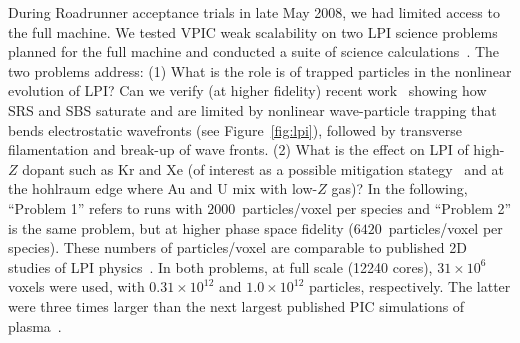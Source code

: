 \documentclass[journal,twoside]{IEEEtran}
\newcommand{\fig}[1]{Figure~\ref{fig:#1}}
\begin{document}
During Roadrunner acceptance trials in late May 2008, we had limited
access to the full machine.  We tested VPIC weak scalability on two
LPI science problems planned for the full machine and conducted a
suite of science calculations~\cite{AAC_Conference_Paper}.  The two
problems
address:
(1) What is the role is of trapped particles in the nonlinear
evolution of LPI?  Can we verify (at higher fidelity) recent
work~\cite{Yin_et_al_PRL_2007_SRS,Yin_et_al_Phys_Plasmas_2007_SRS}
showing how SRS and SBS saturate and are limited by nonlinear
wave-particle trapping that bends electrostatic wavefronts (see
\fig{lpi}), followed by transverse filamentation and break-up
of wave fronts.
(2) What is the effect on LPI of high-$Z$ dopant such as Kr and Xe (of
interest as a possible mitigation stategy~\cite{Lushnikov_PPCF_2006}
and at the hohlraum edge where Au and U mix with low-$Z$ gas)?
In the following, ``Problem 1'' refers to runs with
$2000$~particles/voxel per species and ``Problem 2'' is the same
problem, but at higher phase space fidelity ($6420$~particles/voxel
per species).  These numbers of particles/voxel are comparable to
published 2D studies of LPI
physics~\cite{Yin_et_al_PRL_2007_SRS,Yin_et_al_Phys_Plasmas_2007_SRS}.
In both problems, at full scale (12240 cores), $31 \times 10^6$ voxels
were used, with $0.31 \times 10^{12}$ and $1.0 \times 10^{12}$
particles, respectively.  The latter were three times larger than the
next largest published PIC simulations of
plasma~\cite{Yin_et_al_PRL_2007_reconnection}.


\end{document}
